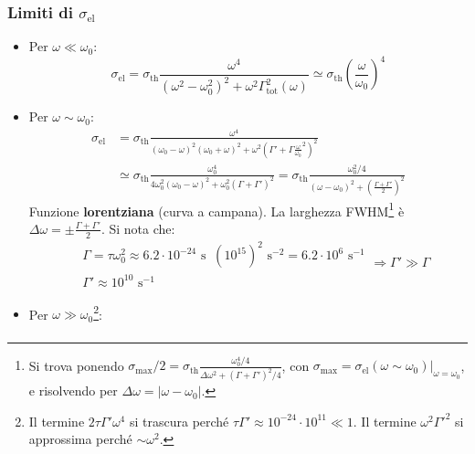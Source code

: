 \documentclass[10pt, a4paper]{scrartcl}
\numberwithin{equation}{subsection}
\theoremstyle{style1}
\begin{document}
\subsubsection{Limiti di $\sigma_\text{el}$}
\begin{itemize}
	\item Per $\omega\ll\omega_0$:
		\begin{equation}
			\sigma _{\text{el}} = \sigma _\text{th} \frac{\omega^4}{(\omega^2-\omega_0^2)^2 + \omega^2  \Gamma_\text{tot}^2(\omega)} \simeq\sigma _\text{th} \left(\frac{\omega}{\omega_0}\right) ^4
		\end{equation}
	\item Per $\omega \sim \omega_0$:
		\begin{equation}
			\begin{split}
				\sigma _\text{el} &= \sigma _\text{th} \frac{\omega^4}{(\omega_0 -\omega)^2 (\omega_0 +\omega)^2 + \omega^2 \left(\Gamma' + \Gamma \frac{\omega}{\omega_0} ^2\right)^2}\\
						  &\simeq \sigma _\text{th} \frac{\omega_0^4}{4\omega_0^2 (\omega_0-\omega)^2 + \omega_0^2 (\Gamma+\Gamma')^2} = \sigma _\text{th} \frac{\omega_0^2 / 4}{(\omega-\omega_0)^2 + \left(\frac{\Gamma+\Gamma'}{2}\right) ^2}
			\end{split}
		\end{equation}
		Funzione \textbf{lorentziana} (curva a campana). La larghezza FWHM\footnote{Si trova ponendo $\sigma _\text{max} / 2 = \sigma _\text{th} \frac{\omega_0^4 / 4}{\Delta \omega^2 + (\Gamma+\Gamma')^2 / 4}$, con $\sigma _\text{max}= \sigma _\text{el}(\omega \sim \omega_0) |_{\omega = \omega_0} $, e risolvendo per $\Delta \omega = |\omega-\omega_0|$.} \`e $\Delta \omega = \pm \frac{\Gamma+\Gamma'}{2}$. Si nota che:
		\begin{equation}
			\begin{split}
				&\Gamma = \tau  \omega_0 ^2 \approx 6.2 \cdot 10^{-24} \text{ s } \ (10^{15} )^2 \text{ s}^{-2}  = 6.2 \cdot 10^{6} \text{ s}^{-1} \\
				&\Gamma' \approx 10^{10} \text{ s}^{-1} 
			\end{split} \Rightarrow \Gamma' \gg \Gamma
		\end{equation}
	\item Per $\omega\gg\omega_0$\footnote{Il termine $2\tau \Gamma' \omega^4$ si trascura perch\'e $\tau  \Gamma' \approx 10^{-24} \cdot 10^{11}  \ll 1$. Il termine $\omega^2 \Gamma'^2$ si approssima perch\'e $\sim \omega^2$.}:
		\begin{equation}
			\begin{split}

\end{split}
\end{equation}
\end{itemize}
\end{document}
